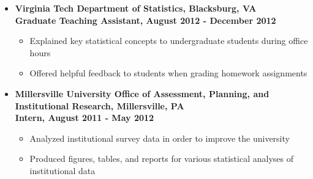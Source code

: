 \documentclass[10pt]{article}
\begin{document}
\begin{itemize}
\item[] \textbf{Virginia Tech Department of Statistics, Blacksburg, VA\\
Graduate Teaching Assistant, August 2012 - December 2012}
\begin{itemize}
\item Explained key statistical concepts to undergraduate students during office hours
\item Offered helpful feedback to students when grading homework assignments
\end{itemize}

\item[] \textbf{Millersville University Office of Assessment, Planning, and Institutional Research, Millersville, PA \\
Intern, August 2011 - May 2012}
\begin{itemize}
\item Analyzed institutional survey data in order to improve the university
\item Produced figures, tables, and reports for various statistical analyses of institutional data
\end{itemize}


\end{itemize}
\end{document}

